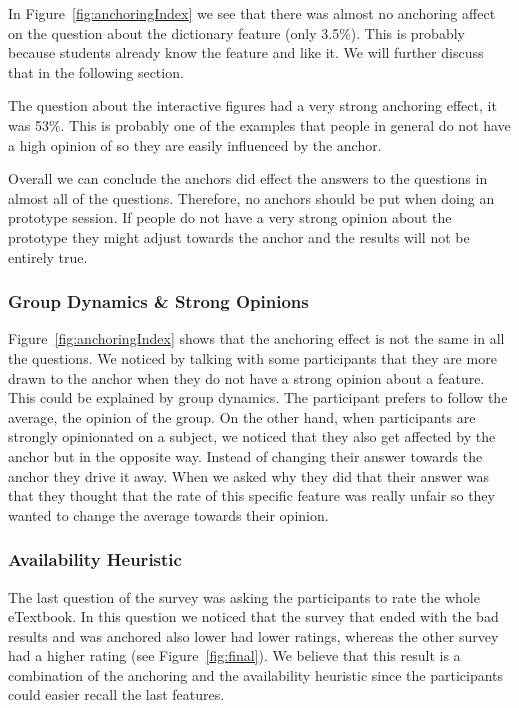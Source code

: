 \documentclass[Main.tex]{subfiles}
\begin{document}
In Figure~\ref{fig:anchoringIndex} we see that there was almost no anchoring affect on the question about the dictionary feature (only 3.5\%). This is probably because students already know the feature and like it. We will further discuss that in the following section.

The question about the interactive figures had a very strong anchoring effect, it was 53\%. This is probably one of the examples that people in general do not have a high opinion of so they are easily influenced by the anchor.

Overall we can conclude the anchors did effect the answers to the questions in almost all of the questions. Therefore, no anchors should be put when doing an prototype session. If people do not have a very strong opinion about the prototype they might adjust towards the anchor and the results will not be entirely true.


\subsubsection{Group Dynamics \& Strong Opinions}
Figure~\ref{fig:anchoringIndex} shows that the anchoring effect is not the same in all the questions. We noticed by talking with some participants that they are more drawn to the anchor when they do not have a strong opinion about a feature. This could be explained by group dynamics. The participant prefers to follow the average, the opinion of the group. On the other hand, when  participants are strongly opinionated on a subject, we noticed that they also get affected by the anchor but in the opposite way. Instead of changing their answer towards the anchor they drive it away. When we asked why they did that their answer was that they thought that the rate of this specific feature was really unfair so they wanted to change the average towards their opinion. 

\subsubsection{Availability Heuristic}
The last question of the survey was asking the participants to rate the whole eTextbook. In this question we noticed that the survey that ended with the bad results and was anchored also lower had lower ratings, whereas the other survey  had a higher rating (see Figure~\ref{fig:final}). We believe that this result is a combination of the anchoring and the availability heuristic since the participants could easier recall the last features. 
\end{document}
